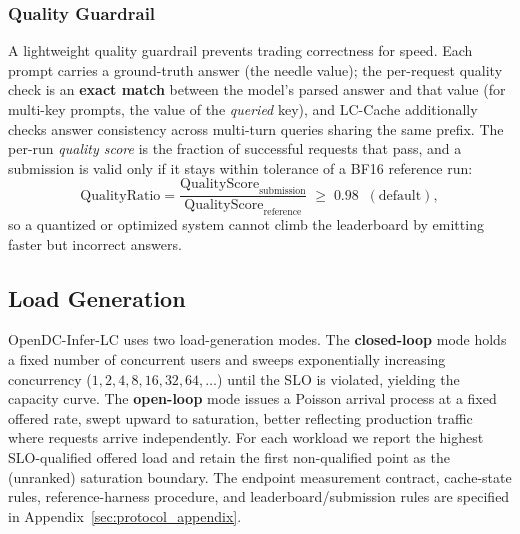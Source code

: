 \subsubsection{Quality Guardrail}
\label{subsec:quality}
A lightweight quality guardrail prevents trading correctness for speed. Each prompt
carries a ground-truth answer (the needle value); the per-request quality check is
an \textbf{exact match} between the model's parsed answer and that value (for
multi-key prompts, the value of the \emph{queried} key), and LC-Cache additionally
checks answer consistency across multi-turn queries sharing the same prefix. The
per-run \emph{quality score} is the fraction of successful requests that pass, and a
submission is valid only if it stays within tolerance of a BF16 reference run:
\begin{equation}
\mathrm{QualityRatio}
= \frac{\mathrm{QualityScore}_{\mathrm{submission}}}{\mathrm{QualityScore}_{\mathrm{reference}}}
\;\geq\; 0.98 \;\;(\text{default}),
\label{eq:qualityratio}
\end{equation}
so a quantized or optimized system cannot climb the leaderboard by emitting faster
but incorrect answers.

\subsection{Load Generation}
\label{subsec:load_generation}
OpenDC-Infer-LC uses two load-generation modes. The \textbf{closed-loop} mode holds
a fixed number of concurrent users and sweeps exponentially increasing concurrency
($1,2,4,8,16,32,64,\ldots$) until the SLO is violated, yielding the capacity curve.
The \textbf{open-loop} mode issues a Poisson arrival process at a fixed offered
rate, swept upward to saturation, better reflecting production traffic where
requests arrive independently. For each workload we report the highest
SLO-qualified offered load and retain the first non-qualified point as the
(unranked) saturation boundary. The endpoint measurement contract, cache-state
rules, reference-harness procedure, and leaderboard/submission rules are specified
in Appendix~\ref{sec:protocol_appendix}.
